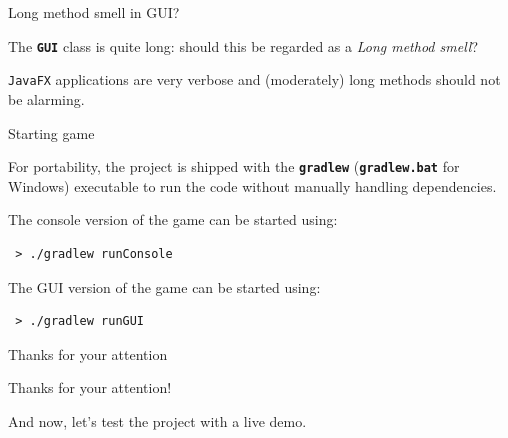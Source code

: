 \documentclass{beamer}
\begin{document}
  \begin{frame}{Long method smell in GUI?}

    The \textbf{\texttt{GUI}} class is quite long: should this be regarded as a \textit{Long method smell}?

    \vspace{1em}

    \begin{centering}


    \end{centering}

    \vspace{1em}

    \texttt{JavaFX} applications are very verbose and (moderately) long methods should not be alarming.

  \end{frame}



  \begin{frame}[fragile]{Starting game}

    For portability, the project is shipped with the \texttt{\textbf{gradlew}} (\texttt{\textbf{gradlew.bat}} for Windows) executable to run the code without manually handling dependencies.

    \vspace{2em}

    The console version of the game can be started using:

    \begin{lstlisting}
 > ./gradlew runConsole
    \end{lstlisting}

    \vspace{1em}

    The GUI version of the game can be started using:

    \begin{lstlisting} 
 > ./gradlew runGUI
    \end{lstlisting}

  \end{frame}


  \begin{frame} {Thanks for your attention}

    Thanks for your attention!

    \vspace{2em}

    And now, let's test the project with a live demo.


  \end{frame}
\end{document}
